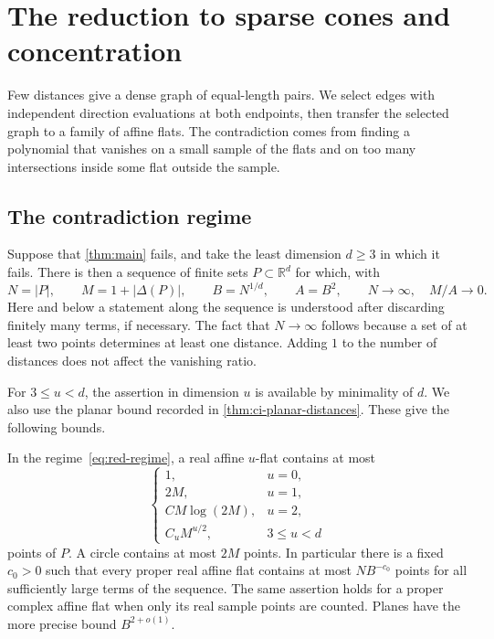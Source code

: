 \section{The reduction to sparse cones and concentration}
\label{sec:reduction}

Few distances give a dense graph of equal-length pairs. We select edges with independent direction evaluations at both endpoints, then transfer the selected graph to a family of affine flats. The contradiction comes from finding a polynomial that vanishes on a small sample of the flats and on too many intersections inside some flat outside the sample.

\subsection{The contradiction regime}

Suppose that \cref{thm:main} fails, and take the least dimension $d\ge3$ in which it fails. There is then a sequence of finite sets $P\subset\mathbb{R}^d$ for which, with
\begin{equation}\label{eq:red-regime}
 N=|P|,\qquad M=1+|\Delta(P)|,\qquad
 B=N^{1/d},\qquad A=B^2,
 \qquad N\longrightarrow\infty,\quad M/A\longrightarrow0.
\end{equation}
Here and below a statement along the sequence is understood after discarding finitely many terms, if necessary. The fact that $N\to\infty$ follows because a set of at least two points determines at least one distance. Adding $1$ to the number of distances does not affect the vanishing ratio.

For $3\le u<d$, the assertion in dimension $u$ is available by minimality of $d$. We also use the planar bound recorded in \cref{thm:ci-planar-distances}. These give the following bounds.

\begin{lemma}\label{lem:red-flat-caps}
In the regime~\eqref{eq:red-regime}, a real affine $u$-flat contains at most
\[
 \begin{cases}
  1,&u=0,\\
  2M,&u=1,\\
  C M\log(2M),&u=2,\\
  C_u M^{u/2},&3\le u<d
 \end{cases}
\]
points of $P$. A circle contains at most $2M$ points. In particular there is a fixed $c_0>0$ such that every proper real affine flat contains at most $N B^{-c_0}$ points for all sufficiently large terms of the sequence. The same assertion holds for a proper complex affine flat when only its real sample points are counted. Planes have the more precise bound $B^{2+o(1)}$.
\end{lemma}

